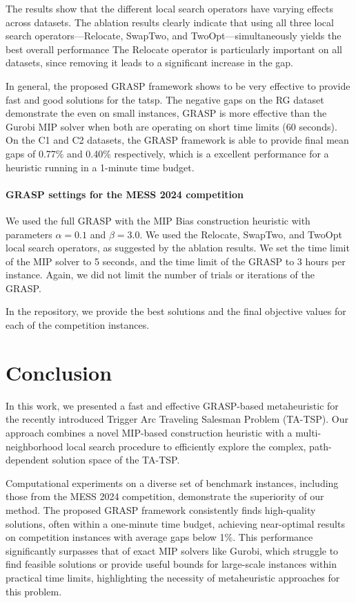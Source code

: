 The results show that the different local search operators have varying effects across datasets.
The ablation results clearly indicate that using all three local search operators—Relocate, SwapTwo, and TwoOpt—simultaneously yields the best overall performance
The Relocate operator is particularly important on all datasets, since removing it leads to a significant increase in the gap.

In general, the proposed GRASP framework shows to be very effective to provide fast and good solutions for the \gls{tatsp}.
The negative gaps on the RG dataset demonstrate the even on small instances, GRASP is more effective than the Gurobi MIP solver when both are operating on short time limits (60 seconds).
On the C1 and C2 datasets, the GRASP framework is able to provide final mean gaps of 0.77\% and 0.40\% respectively, which is a excellent performance for a heuristic running in a 1-minute time budget.

\paragraph{GRASP settings for the MESS 2024 competition}

We used the full GRASP with the MIP Bias construction heuristic with parameters $\alpha = 0.1$ and $\beta = 3.0$.
We used the Relocate, SwapTwo, and TwoOpt local search operators, as suggested by the ablation results.
We set the time limit of the MIP solver to 5 seconds, and the time limit of the GRASP to 3 hours per instance.
Again, we did not limit the number of trials or iterations of the GRASP.

In the repository, we provide the best solutions and the final objective values for each of the competition instances.


\section{Conclusion}
In this work, we presented a fast and effective GRASP-based metaheuristic for the recently introduced Trigger Arc Traveling Salesman Problem (TA-TSP).
Our approach combines a novel MIP-based construction heuristic with a multi-neighborhood local search procedure to efficiently explore the complex, path-dependent solution space of the TA-TSP.

Computational experiments on a diverse set of benchmark instances, including those from the MESS 2024 competition, demonstrate the superiority of our method. The proposed GRASP framework consistently finds high-quality solutions, often within a one-minute time budget, achieving near-optimal results on competition instances with average gaps below 1\%. This performance significantly surpasses that of exact MIP solvers like Gurobi, which struggle to find feasible solutions or provide useful bounds for large-scale instances within practical time limits, highlighting the necessity of metaheuristic approaches for this problem.

